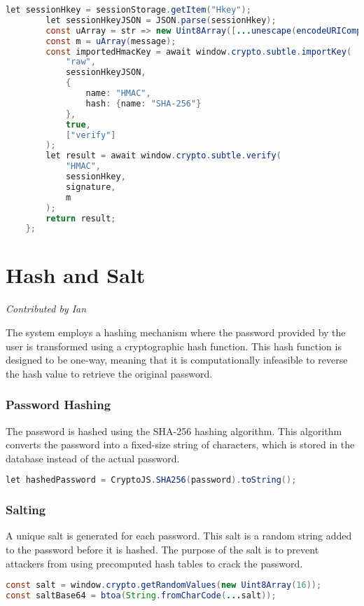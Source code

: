 \documentclass{article}
\begin{document}
\begin{lstlisting}[language=Java]
        let sessionHkey = sessionStorage.getItem("Hkey");
        let sessionHkeyJSON = JSON.parse(sessionHkey);
        const uArray = str => new Uint8Array([...unescape(encodeURIComponent(str))].map(c => c.charCodeAt(0)));
        const m = uArray(message);
        const importedHmacKey = await window.crypto.subtle.importKey(
            "raw",
            sessionHkeyJSON,
            {
                name: "HMAC",
                hash: {name: "SHA-256"}
            },
            true,
            ["verify"]
        );
        let result = await window.crypto.subtle.verify(
            "HMAC",
            sessionHkey,
            signature,
            m
        );
        return result;
    };   
\end{lstlisting}

\section{Hash and Salt}
\textit{Contributed by Ian}

The system employs a hashing mechanism where the password provided by the user is transformed using a cryptographic hash function. This hash function is designed to be one-way, meaning that it is computationally infeasible to reverse the hash value to retrieve the original password.

\subsubsection*{Password Hashing}
The password is hashed using the SHA-256 hashing algorithm. This algorithm converts the password into a fixed-size string of characters, which is stored in the database instead of the actual password.

\begin{lstlisting}[language=Java]
let hashedPassword = CryptoJS.SHA256(password).toString();
\end{lstlisting}

\subsubsection*{Salting}
A unique salt is generated for each password. This salt is a random string added to the password before it is hashed. The purpose of the salt is to prevent attackers from using precomputed hash tables to crack the password.

\begin{lstlisting}[language=Java]
const salt = window.crypto.getRandomValues(new Uint8Array(16));
const saltBase64 = btoa(String.fromCharCode(...salt));
\end{lstlisting}
\end{document}

